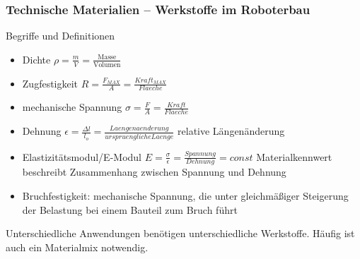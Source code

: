 \subsubsection{Technische Materialien -- Werkstoffe im Roboterbau}
Begriffe und Definitionen
\begin{itemize}
	\item Dichte $\rho = \frac{m}{V} = \frac{\text{Masse}}{\text{Volumen}}$
	\item Zugfestigkeit $R = \frac{F_{MAX}}{A} = \frac{Kraft_{MAX}}{Flaeche}$
	\item mechanische Spannung $\sigma = \frac{F}{A} = \frac{Kraft}{Flaeche}$
	\item Dehnung $\epsilon = \frac{\Delta l}{l_o} = \frac{Laengenaenderung}{urspruengliche Laenge}$
	relative Längenänderung
	\item Elastizitätsmodul/E-Modul $E = \frac{\sigma}{\epsilon} = \frac{Spannung}{Dehnung} = const$
	Materialkennwert beschreibt Zusammenhang zwischen Spannung und Dehnung
	\item Bruchfestigkeit: mechanische Spannung, die unter gleichmäßiger Steigerung der Belastung bei einem Bauteil zum Bruch führt
\end{itemize}
Unterschiedliche Anwendungen benötigen unterschiedliche Werkstoffe. Häufig ist auch ein Materialmix notwendig.

